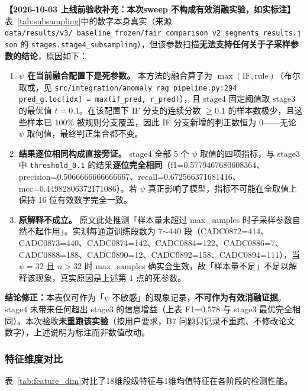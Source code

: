 \documentclass[12pt, a4paper]{article}
\begin{document}
\textbf{【2026-10-03 上线前验收补充：本次sweep 不构成有效消融实验，如实标注】}
表~\ref{tab:subsampling}中的数字本身真实（来源 \texttt{data/results/v3/\_baseline\_frozen/fair\_comparison\_v2\_segments\_results.json} 的 \texttt{stages.stage4\_subsampling}），但该参数扫描\textbf{无法支持任何关于子采样参数的结论}，原因如下：
\begin{enumerate}
\item \textbf{$\psi$ 在当前融合配置下是死参数。} 本方法的融合算子为 $\max(\mathrm{IF},\mathrm{rule})$（布尔取或，见 \texttt{src/integration/anomaly\_rag\_pipeline.py:294} \texttt{pred\_g.loc[idx] = max(if\_pred, r\_pred)}），且 stage4 固定阈值取 stage3 的最优值 $t=0.1$。在该配置下 IF 分支的连续分数 $\geq 0.1$ 的样本数极少，且这些样本已 100\% 被规则分支覆盖，因此 IF 分支新增的判正数恒为 0——无论 $\psi$ 取何值，最终判正集合都不变。
\item \textbf{结果逐位相同构成直接旁证。} stage4 全部 5 个 $\psi$ 取值的四项指标，与 stage3 中 \texttt{threshold\_0.1} 的结果\textbf{逐位完全相同}（f1=0.5779467680608364、precision=0.5066666666666667、recall=0.672566371681416、mcc=0.44982806372171086）。若 $\psi$ 真正影响了模型，指标不可能在全取值上保持 16 位有效数字完全一致。
\item \textbf{原解释不成立。} 原文此处推测「样本量未超过 max\_samples 时子采样参数自然不起作用」。实测每通道训练段数为 7$\sim$440 段（CADC0872=414、CADC0873=440、CADC0874=142、CADC0884=122、CADC0886=7、CADC0888=188、CADC0890=12、CADC0892=158、CADC0894=111），当 $\psi=32$ 且 $n>32$ 时 max\_samples 确实会生效，故「样本量不足」不足以解释该现象，真实原因是上述第 1 点的死参数。
\end{enumerate}
\textbf{结论修正：}本表仅可作为「$\psi$ 不敏感」的现象记录，\textbf{不可作为有效消融证据}。stage4 未带来任何超出 stage3 的信息增益（上表 F1=0.578 与 stage3 最优完全相同）。本次验收\textbf{未重跑该实验}（按用户要求，B7 问题只记录不重跑、不修改论文数字），上述说明为标注而非数值改动。

\subsubsection{特征维度对比}

表~\ref{tab:feature_dim}对比了18维段级特征与1维均值特征在各阶段的检测性能。
\end{document}
